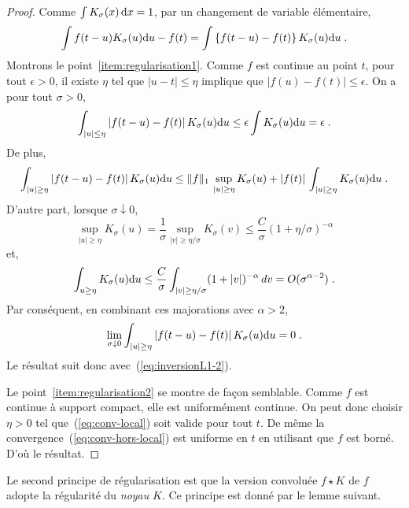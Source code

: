 \begin{proof}
Comme $\int K_\sigma(x)\, \mathrm{d} x= 1$, par un changement de variable {\'e}l{\'e}mentaire,
\begin{equation}
\label{eq:inversionL1-2}
\int f(t-u) K_\sigma(u) \mathrm{d} u - f(t) = \int \left\{ f(t - u) - f(t)  \right\} K_\sigma(u) \mathrm{d} u \;.
\end{equation}
Montrons le point~\ref{item:regularisation1}.
Comme $f$ est continue au point $t$, pour tout $\epsilon > 0$, il existe $\eta$ tel que $|u-t| \leq \eta$
implique que $|f(u) - f(t) | \leq \epsilon$. On a pour tout $\sigma > 0$,
\begin{equation}
\label{eq:conv-local}
\int_{|u| \leq \eta} \left|  f(t-u) - f(t) \right| K_\sigma(u) \mathrm{d} u \leq \epsilon \int K_\sigma(u) \mathrm{d} u = \epsilon \;.
\end{equation}
De plus,
$$
\int_{|u| \geq \eta} \left| f(t-u) - f(t) \right| K_\sigma(u) \mathrm{d} u  \leq \|f\|_1\,\sup_{|u|\geq\eta} {K}_\sigma(u)
+|f(t)|\,\int_{|u|\geq \eta} {K}_\sigma(u) \mathrm{d} u  \;.
$$
D'autre part, lorsque $\sigma \downarrow 0$,
$$
\sup_{|u|\geq\eta} {K}_\sigma(u) = \frac1\sigma \sup_{|v|\geq\eta/\sigma} {K}_\sigma(v)\leq  \frac{C}\sigma (1+\eta/\sigma)^{-\alpha}
$$
et,
$$
\int_{u\geq \eta} K_\sigma(u) \mathrm{d} u \leq \frac{C}\sigma\int_{|v|\geq\eta/\sigma} (1+|v|)^{-\alpha}\,dv =O(\sigma^{\alpha-2})\;.
$$
Par cons{\'e}quent, en combinant ces majorations avec $\alpha>2$,
\begin{equation}
\label{eq:conv-hors-local}
\lim_{\sigma \downarrow 0} \int_{|u| \geq \eta} \left|  f(t-u) - f(t) \right| K_\sigma(u) \mathrm{d} u =0 \;.
\end{equation}
Le r{\'e}sultat suit donc avec~(\ref{eq:inversionL1-2}).

Le point~\ref{item:regularisation2} se montre de fa\c{c}on semblable.
Comme $f$ est continue {\`a} support compact, elle est uniform{\'e}ment continue.
On peut donc choisir $\eta>0$ tel que~(\ref{eq:conv-local}) soit valide pour
tout $t$. De m{\^e}me la convergence~(\ref{eq:conv-hors-local}) est uniforme en $t$
en utilisant que $f$ est born{\'e}. D'o{\`u} le r{\'e}sultat.
\end{proof}

Le second principe de r{\'e}gularisation est que la version convolu{\'e}e $f\star K$ de
$f$ adopte la r{\'e}gularit{\'e} du \emph{noyau} $K$. Ce principe est donn{\'e} par le
lemme suivant.

